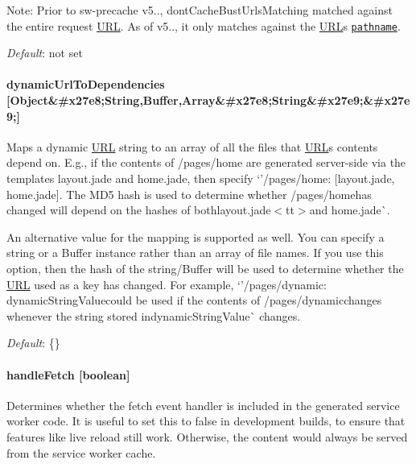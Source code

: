 Note\+: Prior to {\ttfamily sw-\/precache} v5.., {\ttfamily dont\+Cache\+Bust\+Urls\+Matching} matched against the entire request \mbox{\hyperlink{namespace_u_r_l}{U\+RL}}. As of v5.., it only matches against the \mbox{\hyperlink{namespace_u_r_l}{U\+RL}}\textquotesingle{}s \href{https://developer.mozilla.org/en-US/docs/Web/API/HTMLHyperlinkElementUtils/pathname}{\tt pathname}.

{\itshape Default}\+: not set

\paragraph*{dynamic\+Url\+To\+Dependencies \mbox{[}Object\&\#x27e8;String,Buffer,Array\&\#x27e8;String\&\#x27e9;\&\#x27e9;\mbox{]}}

Maps a dynamic \mbox{\hyperlink{namespace_u_r_l}{U\+RL}} string to an array of all the files that \mbox{\hyperlink{namespace_u_r_l}{U\+RL}}\textquotesingle{}s contents depend on. E.\+g., if the contents of {\ttfamily /pages/home} are generated server-\/side via the templates {\ttfamily layout.\+jade} and {\ttfamily home.\+jade}, then specify `'/pages/home\textquotesingle{}\+: \mbox{[}\textquotesingle{}layout.\+jade\textquotesingle{}, \textquotesingle{}home.\+jade\textquotesingle{}\mbox{]}{\ttfamily . The M\+D5 hash is used to determine whether }/pages/home{\ttfamily has changed will depend on the hashes of both}layout.\+jade$<$tt$>$and home.\+jade\`{}.

An alternative value for the mapping is supported as well. You can specify a string or a Buffer instance rather than an array of file names. If you use this option, then the hash of the string/\+Buffer will be used to determine whether the \mbox{\hyperlink{namespace_u_r_l}{U\+RL}} used as a key has changed. For example, `'/pages/dynamic\textquotesingle{}\+: dynamic\+String\+Value{\ttfamily could be used if the contents of }/pages/dynamic{\ttfamily changes whenever the string stored in}dynamic\+String\+Value\`{} changes.

{\itshape Default}\+: {\ttfamily \{\}}

\paragraph*{handle\+Fetch \mbox{[}boolean\mbox{]}}

Determines whether the {\ttfamily fetch} event handler is included in the generated service worker code. It is useful to set this to {\ttfamily false} in development builds, to ensure that features like live reload still work. Otherwise, the content would always be served from the service worker cache.

